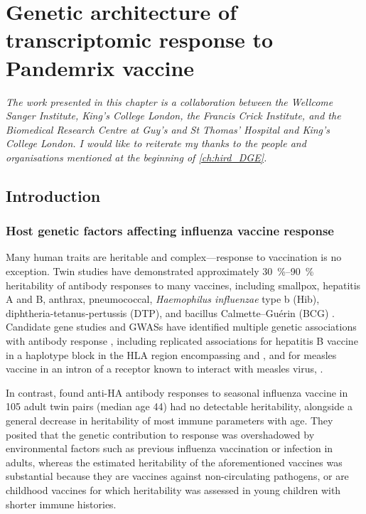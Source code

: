 %
%

\chapter{Genetic architecture of transcriptomic response to Pandemrix vaccine}
\label{ch:hird_reQTL}

\textit{
    The work presented in this chapter is a collaboration between 
    the Wellcome Sanger Institute,
    King's College London, 
    the Francis Crick Institute,
    and the Biomedical Research Centre at Guy's and St Thomas' Hospital and King's College London.
    I would like to reiterate my thanks to the people and organisations mentioned at the beginning of \cref{ch:hird_DGE}.
}

\section{Introduction}

\subsection{Host genetic factors affecting influenza vaccine response}
\label{subsec:hird_reQTL_intro_geneticFactorsFluVaccine}

Many human traits are heritable and complex---response to vaccination is no exception.
Twin studies have demonstrated approximately \SIrange{30}{90}{\percent} heritability of antibody responses to many vaccines, including smallpox, hepatitis A and B, anthrax, pneumococcal, \textit{Haemophilus influenzae} type b (Hib), diphtheria-tetanus-pertussis (DTP), and bacillus Calmette--Guérin (BCG) \autocite{mooney2013SystemsImmunogeneticsVaccines,oconnor2013CharacterizingVaccineResponses,newport2015GeneticRegulationInfant,brodin2015VariationHumanImmune}.
Candidate gene studies and \glspl{GWAS} have identified multiple genetic associations with antibody response \autocite{mooney2013SystemsImmunogeneticsVaccines,oconnor2013CharacterizingVaccineResponses,mentzer2015SearchingHumanGenetic,linnik2016ImpactHostGenetic}, 
including replicated associations 
for hepatitis B vaccine in a haplotype block in the \gls{HLA} region encompassing  and ,
and for measles vaccine in an intron of a receptor known to interact with measles virus, .

In contrast, \textcite{brodin2015VariationHumanImmune} found anti-\gls{HA} antibody responses to seasonal influenza vaccine in 105 adult twin pairs (median age \SI{44}{\year}) had no detectable heritability,
alongside a general decrease in heritability of most immune parameters with age.
They posited 
that the genetic contribution to response was overshadowed by environmental factors such as previous influenza vaccination or infection in adults, 
whereas the estimated heritability of the aforementioned vaccines was substantial
because they are vaccines against non-circulating pathogens, 
or are childhood vaccines for which heritability was assessed in young children with shorter immune histories.

